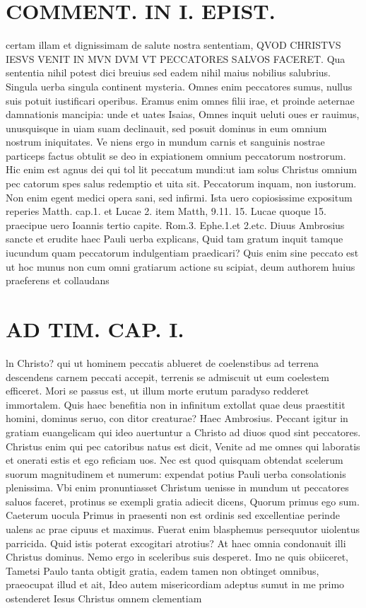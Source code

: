 \documentclass{article}
\begin{document}
\begin{pages}
\section*{COMMENT. IN I. EPIST. }\pstart certam illam et dignissimam de salute nostra sententiam, QVOD CHRISTVS IESVS VENIT IN MVN DVM VT PECCATORES SALVOS FACERET. Qua sententia nihil potest dici breuius sed eadem nihil maius nobilius salubrius. Singula uerba singula continent mysteria. Omnes enim peccatores sumus, nullus suis potuit iustificari operibus. Eramus enim omnes filii irae, et proinde aeternae damnationis mancipia: unde et uates Isaias, Omnes inquit ueluti oues er rauimus, unusquisque in uiam suam declinauit, sed posuit dominus in eum omnium nostrum iniquitates. Ve niens ergo in mundum carnis et sanguinis nostrae particeps factus obtulit se deo in expiationem omnium peccatorum nostrorum. Hic enim est agnus dei qui tol lit peccatum mundi:ut iam solus Christus omnium pec catorum spes salus redemptio et uita sit. Peccatorum inquam, non iustorum. Non enim egent medici opera sani, sed infirmi. Ista uero copiosissime expositum reperies Matth. cap.1. et Lucae 2. item Matth, 9.11. 15. Lucae quoque 15. praecipue uero Ioannis tertio capite. Rom.3. Ephe.1.et 2.etc. Diuus Ambrosius sancte et erudite haec Pauli uerba explicans, Quid tam gratum inquit tamque iucundum quam peccatorum indulgentiam praedicari? Quis enim sine peccato est ut hoc munus non cum omni gratiarum actione su scipiat, deum authorem huius praeferens et collaudans  \pend
\section*{AD TIM. CAP. I. }
\marginpar{[ p.105 ]}\pstart ln Christo? qui ut hominem peccatis ablueret de coelenstibus ad terrena descendens carnem peccati accepit, terrenis se admiscuit ut eum coelestem efficeret. Mori se passus est, ut illum morte erutum paradyso redderet immortalem. Quis haec benefitia non in infinitum extollat quae deus praestitit homini, dominus seruo, con ditor creaturae? Haec Ambrosius. Peccant igitur in gratiam euangelicam qui ideo auertuntur a Christo ad diuos quod sint peccatores. Christus enim qui pec catoribus natus est dicit, Venite ad me omnes qui laboratis et onerati estis et ego reficiam uos. Nec est quod quisquam obtendat scelerum suorum magnitudinem et numerum: expendat potius Pauli uerba consolationis plenissima. Vbi enim pronuntiasset Christum uenisse in mundum ut peccatores saluos faceret, protinus se exempli gratia adiecit dicens, Quorum primus ego sum. Caeterum uocula Primus in praesenti non est ordinis sed excellentiae perinde ualens ac prae cipuus et maximus. Fuerat enim blasphemus persequutor uiolentus parricida. Quid istis poterat excogitari atrotius? At haec omnia condonauit illi Christus dominus. Nemo ergo in sceleribus suis desperet. Imo ne quis obiiceret, Tametsi Paulo tanta obtigit gratia, eadem tamen non obtinget omnibus, praeocupat illud et ait, Ideo autem misericordiam adeptus sumut in me primo ostenderet Iesus Christus omnem clementiam  \pend

\end{pages}
\end{document}
